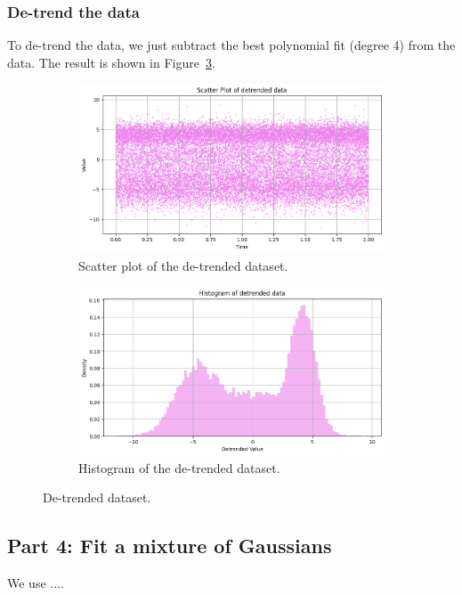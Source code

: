 \documentclass[a4paper]{article}
\begin{document}
\subsubsection*{De-trend the data}

To de-trend the data, we just subtract the best polynomial fit (degree 4) from the data. The result is shown in Figure~\ref{fig:detrended}.

\begin{figure}[htbp]
  \centering
  \begin{subfigure}[b]{0.48\textwidth}
    \centering
    \includegraphics[width=\textwidth]{images/detrended_scatter.png}
    \caption{
      Scatter plot of the de-trended dataset.
    }\label{fig:detrended-scatter}
  \end{subfigure}
  \hfill
  \begin{subfigure}[b]{0.48\textwidth}
    \centering
    \includegraphics[width=\textwidth]{images/detrended_dist.png}
    \caption{
      Histogram of the de-trended dataset.
    }\label{fig:detrended-hist}
  \end{subfigure}
  \caption{
    De-trended dataset.
  }\label{fig:detrended}
\end{figure}

\subsection*{Part 4: Fit a mixture of Gaussians}

We use ....
\end{document}
